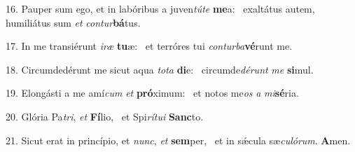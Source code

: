 16. Pauper sum ego, et in labóribus a juven\textit{tú}\textit{te} \textbf{me}a: \ast\  exaltátus autem, humiliátus sum \textit{et} \textit{con}\textit{tur}\textbf{bá}tus.\

17. In me transiérunt \textit{i}\textit{ræ} \textbf{tu}æ: \ast\  et terróres tui \textit{con}\textit{tur}\textit{ba}\textbf{vé}runt me.\

18. Circumdedérunt me sicut aqua \textit{to}\textit{ta} \textbf{di}e: \ast\  circumde\textit{dé}\textit{runt} \textit{me} \textbf{si}mul.\

19. Elongásti a me amí\textit{cum} \textit{et} \textbf{pró}ximum: \ast\  et notos me\textit{os} \textit{a} \textit{mi}\textbf{sé}ria.\

20. Glória Pa\textit{tri}, \textit{et} \textbf{Fí}lio, \ast\  et Spi\textit{rí}\textit{tu}\textit{i} \textbf{Sanc}to.\

21. Sicut erat in princípio, et \textit{nunc}, \textit{et} \textbf{sem}per, \ast\  et in sǽcula sæ\textit{cu}\textit{ló}\textit{rum}. \textbf{A}men.\

